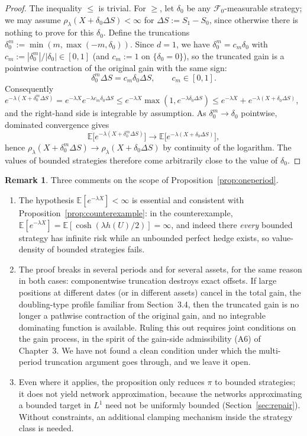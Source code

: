 \documentclass[11pt,a4paper]{report}
\numberwithin{equation}{chapter}
\theoremstyle{plain}
\theoremstyle{definition}
\newtheorem{remark}[proposition]{Remark}
\newcommand{\E}{\mathbb{E}}
\newcommand{\F}{\mathcal{F}}
\begin{document}
\begin{proof}
    The inequality $\le$ is trivial. For $\ge$, let $\delta_0$ be any $\F_0$-measurable strategy; we may assume $\rho_\lambda(X+\delta_0\Delta S)<\infty$ for $\Delta S:=S_1-S_0$, since otherwise there is nothing to prove for this $\delta_0$. Define the truncations $\delta^m_0:=\min(m,\max(-m,\delta_0))$. Since $d=1$, we have $\delta^m_0=c_m\delta_0$ with $c_m:=|\delta^m_0|/|\delta_0|\in[0,1]$ (and $c_m:=1$ on $\{\delta_0=0\}$), so the truncated gain is a pointwise contraction of the original gain with the same sign:
    \[
        \delta^m_0\Delta S=c_m\delta_0\Delta S,\qquad c_m\in[0,1].
    \]
    Consequently $e^{-\lambda(X+\delta^m_0\Delta S)}=e^{-\lambda X}e^{-\lambda c_m\delta_0\Delta S}\le e^{-\lambda X}\max(1,e^{-\lambda\delta_0\Delta S})\le e^{-\lambda X}+e^{-\lambda(X+\delta_0\Delta S)}$, and the right-hand side is integrable by assumption. As $\delta^m_0\to\delta_0$ pointwise, dominated convergence gives
    \[
        \E\bigl[e^{-\lambda(X+\delta^m_0\Delta S)}\bigr]\longrightarrow\E\bigl[e^{-\lambda(X+\delta_0\Delta S)}\bigr],
    \]
    hence $\rho_\lambda(X+\delta^m_0\Delta S)\to\rho_\lambda(X+\delta_0\Delta S)$ by continuity of the logarithm. The values of bounded strategies therefore come arbitrarily close to the value of $\delta_0$.
\end{proof}

\begin{remark}\label{rem:oneperiod-limits}
    Three comments on the scope of Proposition~\ref{prop:oneperiod}.
    \begin{enumerate}[leftmargin=*,itemsep=0pt,parsep=0pt]
        \item[\textup{(i)}] The hypothesis $\E[e^{-\lambda X}]<\infty$ is essential and consistent with Proposition~\ref{prop:counterexample}: in the counterexample, $\E[e^{-\lambda X}]=\E[\cosh(\lambda h(U)/2)]=\infty$, and indeed there \emph{every} bounded strategy has infinite risk while an unbounded perfect hedge exists, so value-density of bounded strategies fails.
        \item[\textup{(ii)}] The proof breaks in several periods and for several assets, for the same reason in both cases: componentwise truncation destroys exact offsets. If large positions at different dates (or in different assets) cancel in the total gain, the doubling-type profile familiar from Section~3.4, then the truncated gain is no longer a pathwise contraction of the original gain, and no integrable dominating function is available. Ruling this out requires joint conditions on the gain process, in the spirit of the gain-side admissibility (A6) of Chapter~3. We have not found a clean condition under which the multi-period truncation argument goes through, and we leave it open.
        \item[\textup{(iii)}] Even where it applies, the proposition only reduces $\pi$ to bounded strategies; it does not yield network approximation, because the networks approximating a bounded target in $L^1$ need not be uniformly bounded (Section~\ref{sec:repair}). Without constraints, an additional clamping mechanism inside the strategy class is needed.
    \end{enumerate}
\end{remark}
\end{document}
